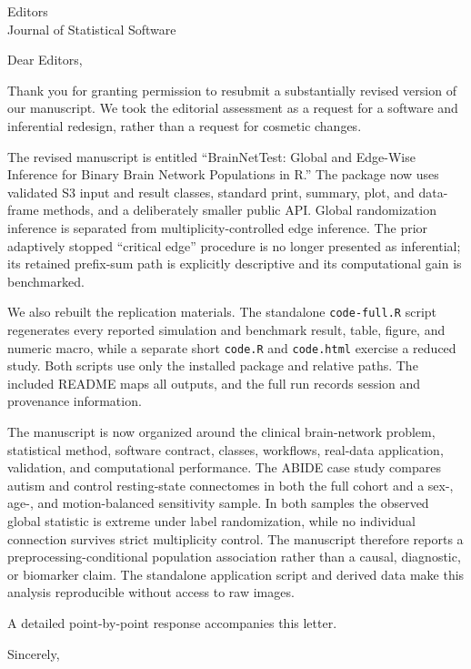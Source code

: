 \documentclass{letter}
\begin{document}
\begin{letter}{Editors\\Journal of Statistical Software}

\opening{Dear Editors,}

Thank you for granting permission to resubmit a substantially revised version
of our manuscript. We took the editorial assessment as a request for a
software and inferential redesign, rather than a request for cosmetic changes.

The revised manuscript is entitled ``BrainNetTest: Global and Edge-Wise
Inference for Binary Brain Network Populations in R.'' The package now uses
validated S3 input and result classes, standard print, summary, plot, and
data-frame methods, and a deliberately smaller public API. Global
randomization inference is separated from multiplicity-controlled edge
inference. The prior adaptively stopped ``critical edge'' procedure is no
longer presented as inferential; its retained prefix-sum path is explicitly
descriptive and its computational gain is benchmarked.

We also rebuilt the replication materials. The standalone
\texttt{code-full.R} script regenerates every reported simulation and
benchmark result, table, figure, and numeric macro, while a separate short
\texttt{code.R} and \texttt{code.html}
exercise a reduced study. Both scripts use only the installed package and
relative paths. The included README maps all outputs, and the full run records
session and provenance information.

The manuscript is now organized around the clinical brain-network problem,
statistical method, software contract, classes, workflows, real-data
application, validation, and computational performance. The ABIDE case study
compares autism and control resting-state connectomes in both the full cohort
and a sex-, age-, and motion-balanced sensitivity sample. In both samples the
observed global statistic is extreme under label randomization, while no
individual connection survives strict multiplicity control. The manuscript
therefore reports a preprocessing-conditional population association rather
than a causal, diagnostic, or biomarker claim. The standalone application
script and derived data make this analysis reproducible without access to raw
images.

A detailed point-by-point response accompanies this letter.

\closing{Sincerely,}
\end{letter}
\end{document}
